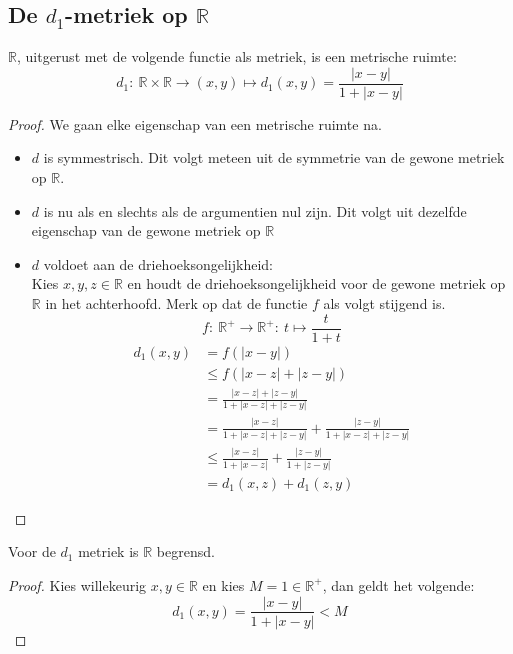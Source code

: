 \documentclass[main.tex]{subfiles}
\begin{document}
\subsection{De $d_1$-metriek op $\mathbb{R}$}
\label{sec:d_1-metriek-op}

\begin{vb}
  $\mathbb{R}$, uitgerust met de volgende functie als metriek, is een metrische ruimte:
  \[ d_{1}:\ \mathbb{R}\times\mathbb{R}\rightarrow (x,y) \mapsto d_{1}(x,y)=\frac{|x-y|}{1+|x-y|} \]
  \begin{proof}
    We gaan elke eigenschap van een metrische ruimte na.
    \begin{itemize}
    \item $d$ is symmestrisch.
      Dit volgt meteen uit de symmetrie van de gewone metriek op $\mathbb{R}$.
    \item $d$ is nu als en slechts als de argumentien nul zijn.
      Dit volgt uit dezelfde eigenschap van de gewone metriek op $\mathbb{R}$
    \item $d$ voldoet aan de driehoeksongelijkheid:\\
      Kies $x,y,z \in \mathbb{R}$ en houdt de driehoeksongelijkheid voor de gewone metriek op $\mathbb{R}$ in het achterhoofd.
      Merk op dat de functie $f$ als volgt stijgend is.
      \[ f:\ \mathbb{R}^{+} \rightarrow \mathbb{R}^{+}:\ t \mapsto \frac{t}{1+t} \]
      \begin{align*}
        d_{1}(x,y)
        &= f(|x-y|)\\
        &\le f(|x-z|+|z-y|)\\
        &= \frac{|x-z|+|z-y|}{1+|x-z|+|z-y|}\\
        &= \frac{|x-z|}{1+|x-z|+|z-y|}+\frac{|z-y|}{1+|x-z|+|z-y|}\\
        &\le \frac{|x-z|}{1+|x-z|}+\frac{|z-y|}{1+|z-y|}\\
        &= d_{1}(x,z) + d_{1}(z,y)
      \end{align*}
    \end{itemize}
  \end{proof}
\end{vb}

\begin{st}
  Voor de $d_{1}$ metriek is $\mathbb{R}$ begrensd.
  \begin{proof}
    Kies willekeurig $x,y\in\mathbb{R}$ en kies $M=1\in \mathbb{R}^{+}$, dan geldt het volgende:
    \[ d_{1}(x,y) = \frac{|x-y|}{1+|x-y|} < M \]
  \end{proof}
\end{st}
\end{document}
